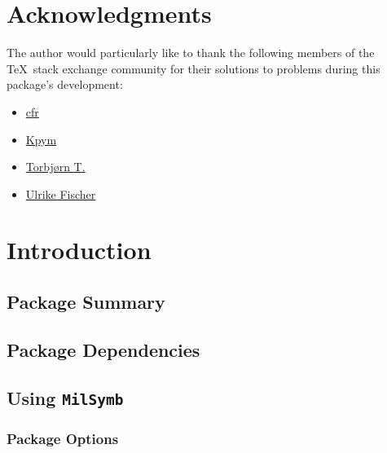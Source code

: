 \documentclass[a4paper, titlepage]{article}
\begin{document}
\clearpage

\begin{versionhistory}
\renewcommand \vhAuthorColWidth{6cm}
\end{versionhistory}

\clearpage

\section*{Acknowledgments}

The author would particularly like to thank the following members of the \TeX\  stack exchange community for their solutions to problems during this package\rq{}s development:

\begin{itemize}
\item \href{https://tex.stackexchange.com/users/39222}{cfr}
\item \href{https://tex.stackexchange.com/users/9335}{Kpym}
\item \href{https://tex.stackexchange.com/users/586}{Torbj\o rn T.}
\item \href{https://tex.stackexchange.com/users/2388}{Ulrike Fischer}
\end{itemize}

\clearpage

\tableofcontents

\clearpage

\section{Introduction}

\subsection{Package Summary}

\subsection{Package Dependencies}

\subsection{Using \textbf{\texttt{MilSymb}}}

\subsubsection{Package Options}
\end{document}
